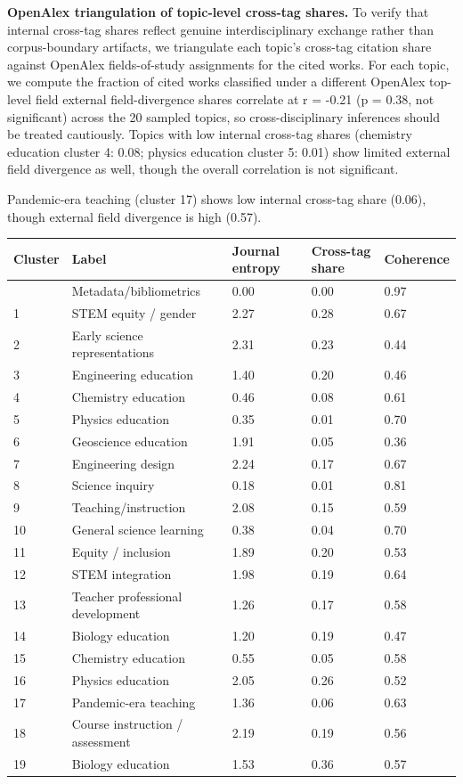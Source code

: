 \documentclass[pdflatex,sn-apa]{sn-jnl}
\newcounter{none}
\begin{document}
\textbf{OpenAlex triangulation of topic-level cross-tag shares.} To
verify that internal cross-tag shares reflect genuine interdisciplinary
exchange rather than corpus-boundary artifacts, we triangulate each
topic's cross-tag citation share against OpenAlex fields-of-study
assignments for the cited works. For each topic, we compute the fraction
of cited works classified under a different OpenAlex top-level field
external field-divergence shares correlate at r = -0.21 (p = 0.38, not
significant) across the 20 sampled topics, so cross-disciplinary
inferences should be treated cautiously. Topics with low internal
cross-tag shares (chemistry education cluster 4: 0.08; physics education
cluster 5: 0.01) show limited external field divergence as well, though
the overall correlation is not significant.

Pandemic-era teaching (cluster 17) shows low internal cross-tag share
(0.06), though external field divergence is high (0.57).

{\def\LTcaptype{none} %
\begin{longtable}[]{@{}lllll@{}}
\toprule\noalign{}
Cluster & Label & Journal entropy & Cross-tag share & Coherence \\
\midrule\noalign{}
\endhead
\bottomrule\noalign{}
\endlastfoot
0 & Metadata/bibliometrics & 0.00 & 0.00 & 0.97 \\
1 & STEM equity / gender & 2.27 & 0.28 & 0.67 \\
2 & Early science representations & 2.31 & 0.23 & 0.44 \\
3 & Engineering education & 1.40 & 0.20 & 0.46 \\
4 & Chemistry education & 0.46 & 0.08 & 0.61 \\
5 & Physics education & 0.35 & 0.01 & 0.70 \\
6 & Geoscience education & 1.91 & 0.05 & 0.36 \\
7 & Engineering design & 2.24 & 0.17 & 0.67 \\
8 & Science inquiry & 0.18 & 0.01 & 0.81 \\
9 & Teaching/instruction & 2.08 & 0.15 & 0.59 \\
10 & General science learning & 0.38 & 0.04 & 0.70 \\
11 & Equity / inclusion & 1.89 & 0.20 & 0.53 \\
12 & STEM integration & 1.98 & 0.19 & 0.64 \\
13 & Teacher professional development & 1.26 & 0.17 & 0.58 \\
14 & Biology education & 1.20 & 0.19 & 0.47 \\
15 & Chemistry education & 0.55 & 0.05 & 0.58 \\
16 & Physics education & 2.05 & 0.26 & 0.52 \\
17 & Pandemic-era teaching & 1.36 & 0.06 & 0.63 \\
18 & Course instruction / assessment & 2.19 & 0.19 & 0.56 \\
19 & Biology education & 1.53 & 0.36 & 0.57 \\
\end{longtable}
}
\end{document}
